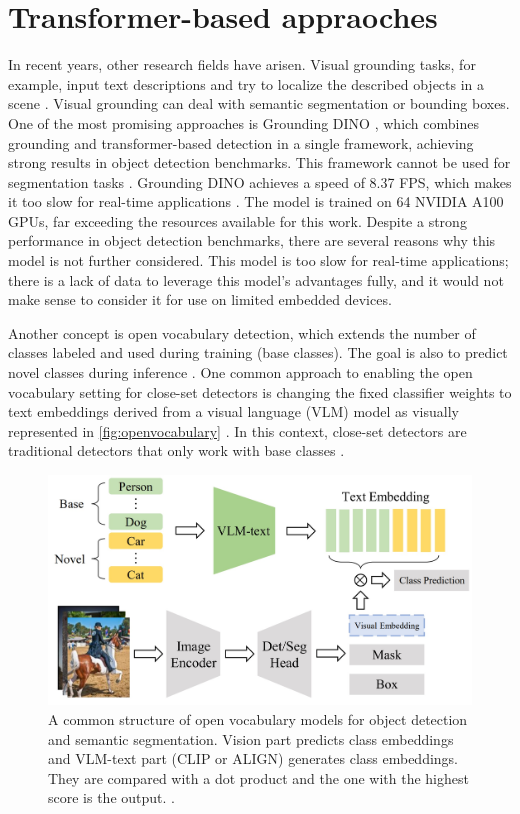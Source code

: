 \section{Transformer-based appraoches}
\label{sec:transformerBasedApproaches}

In recent years, other research fields have arisen.
Visual grounding tasks, for example, input text descriptions and try to localize the described objects in a scene \cite{openvocabularysurvey2024}.
Visual grounding can deal with semantic segmentation or bounding boxes.
One of the most promising approaches is Grounding DINO \cite{groundingdino2024}, which combines grounding and transformer-based detection in a single framework, achieving strong results in object detection benchmarks.
This framework cannot be used for segmentation tasks \cite{glipv22022}.
Grounding DINO achieves a speed of 8.37 FPS, which makes it too slow for real-time applications \cite{groundingdino2024}.
The model is trained on 64 NVIDIA A100 GPUs, far exceeding the resources available for this work.
Despite a strong performance in object detection benchmarks, there are several reasons why this model is not further considered.
This model is too slow for real-time applications; there is a lack of data to leverage this model's advantages fully, and it would not make sense to consider it for use on limited embedded devices.

\vspace{0.5cm}

Another concept is open vocabulary detection, which extends the number of classes labeled and used during training (base classes).
The goal is also to predict novel classes during inference \cite{openvocabularysurvey2024}.
One common approach to enabling the open vocabulary setting for close-set detectors is changing the fixed classifier weights to text embeddings derived from a visual language (VLM) model as visually represented in \autoref{fig:openvocabulary} \cite{openvocabularysurvey2024}.
In this context, close-set detectors are traditional detectors that only work with base classes \cite{anonymous2024openvocabulary}.

\begin{figure}[H]
    \centering
    \includegraphics[width=0.55\linewidth]{PICs/tansformerSOTA/openvocabulary.jpg}
    \caption{A common structure of open vocabulary models for object detection and semantic segmentation. Vision part predicts class embeddings and VLM-text part (CLIP or ALIGN) generates class embeddings. They are compared with a dot product and the one with the highest score is the output. \cite{openvocabularysurvey2024}.}
    \label{fig:openvocabulary}
\end{figure}

